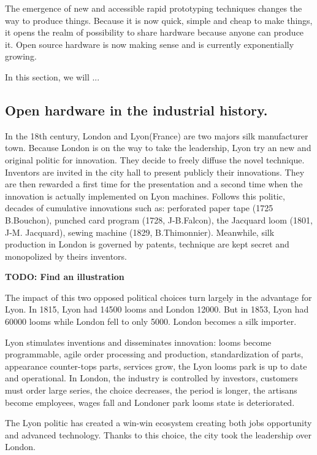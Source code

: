 The emergence of new and accessible rapid prototyping techniques changes the way to produce things. Because it is now quick, simple and cheap to make things, it opens the realm of possibility to share hardware because anyone can produce it. Open source hardware is now making sense and is currently exponentially growing.

In this section, we will ...

\subsection{Open hardware in the industrial history.} %

In the 18th century, London and Lyon(France) are two majors silk manufacturer town. Because London is on the way to take the leadership, Lyon try an new and original politic for innovation. They decide to freely diffuse the novel technique. Inventors are invited in the city hall to present publicly their innovations. They are then rewarded a first time for the presentation and a second time when the innovation is actually implemented on Lyon machines. Follows this politic, decades of cumulative innovations such as: perforated paper tape (1725 B.Bouchon), punched card program (1728, J-B.Falcon), the Jacquard loom (1801, J-M. Jacquard), sewing machine (1829, B.Thimonnier). Meanwhile, silk production in London is governed by patents, technique are kept secret and monopolized by theirs inventors. \cite{alain1997fate}

\textbf{TODO: Find an illustration}

The impact of this two opposed political choices turn largely in the advantage for Lyon. In 1815, Lyon had 14500 looms and London 12000. But in 1853, Lyon had 60000 looms while London fell to only 5000. London becomes a silk importer.

Lyon stimulates inventions and disseminates innovation: looms become programmable, agile order processing and production, standardization of parts, appearance counter-tops parts, services grow, the Lyon looms park is up to date and operational.
In London, the industry is controlled by investors, customers must order large series, the choice decreases, the period is longer, the artisans become employees, wages fall and Londoner park looms state is deteriorated.

The Lyon politic has created a win-win ecosystem creating both jobs opportunity and advanced technology. Thanks to this choice, the city took the leadership over London.

